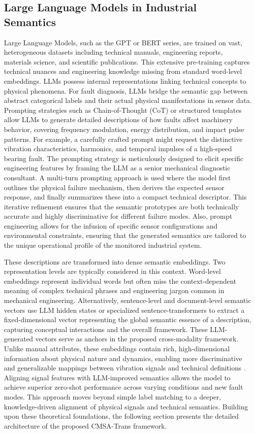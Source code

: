 \subsection{Large Language Models in Industrial Semantics}
Large Language Models, such as the GPT or BERT series, are trained on vast, heterogeneous datasets including technical manuals, engineering reports, materials science, and scientific publications. This extensive pre-training captures technical nuances and engineering knowledge missing from standard word-level embeddings. LLMs possess internal representations linking technical concepts to physical phenomena. For fault diagnosis, LLMs bridge the semantic gap between abstract categorical labels and their actual physical manifestations in sensor data. Prompting strategies such as Chain-of-Thought (CoT) or structured templates allow LLMs to generate detailed descriptions of how faults affect machinery behavior, covering frequency modulation, energy distribution, and impact pulse patterns. For example, a carefully crafted prompt might request the distinctive vibration characteristics, harmonics, and temporal impulses of a high-speed bearing fault. The prompting strategy is meticulously designed to elicit specific engineering features by framing the LLM as a senior mechanical diagnostic consultant. A multi-turn prompting approach is used where the model first outlines the physical failure mechanism, then derives the expected sensor response, and finally summarizes these into a compact technical descriptor. This iterative refinement ensures that the semantic prototypes are both technically accurate and highly discriminative for different failure modes. Also, prompt engineering allows for the infusion of specific sensor configurations and environmental constraints, ensuring that the generated semantics are tailored to the unique operational profile of the monitored industrial system.

These descriptions are transformed into dense semantic embeddings. Two representation levels are typically considered in this context. Word-level embeddings represent individual words but often miss the context-dependent meaning of complex technical phrases and engineering jargon common in mechanical engineering. Alternatively, sentence-level and document-level semantic vectors use LLM hidden states or specialized sentence-transformers to extract a fixed-dimensional vector representing the global semantic essence of a description, capturing conceptual interactions and the overall framework. These LLM-generated vectors serve as anchors in the proposed cross-modality framework. Unlike manual attributes, these embeddings contain rich, high-dimensional information about physical nature and dynamics, enabling more discriminative and generalizable mappings between vibration signals and technical definitions \cite{brown2020language, devlin2018bert, li2024industrial}. Aligning signal features with LLM-improved semantics allows the model to achieve superior zero-shot performance across varying conditions and new fault modes. This approach moves beyond simple label matching to a deeper, knowledge-driven alignment of physical signals and technical semantics. Building upon these theoretical foundations, the following section presents the detailed architecture of the proposed CMSA-Trans framework.
